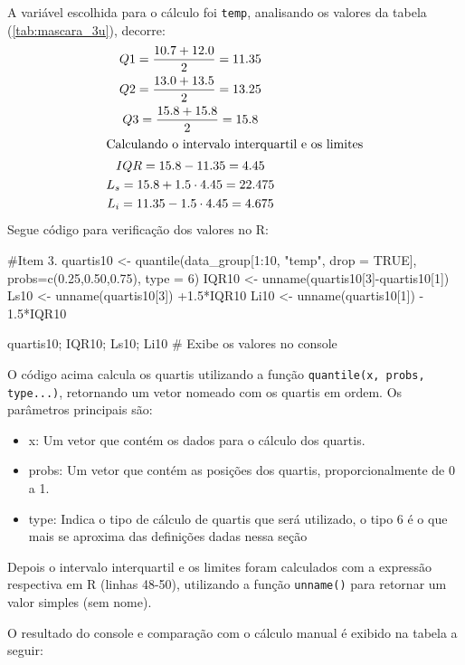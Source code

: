\documentclass[a4paper, 12pt, titlepage]{article}
\begin{document}
A variável escolhida para o cálculo foi \texttt{temp}, analisando os valores da tabela (\ref{tab:mascara_3u}), decorre:
\vspace*{-5mm}
\begin{gather*}
    Q1 = \frac{10.7+12.0}{2}= 11.35\\
    Q2 = \frac{13.0+13.5}{2}= 13.25 \\
    Q3 = \frac{15.8+15.8}{2}= 15.8 \\
    \intertext{Calculando o intervalo interquartil e os limites}
    IQR = 15.8 - 11.35= 4.45 \\
    L_s= 15.8 + 1.5 \cdot 4.45 = 22.475 \\
    L_i= 11.35-1.5 \cdot 4.45 = 4.675
\end{gather*}
\noindent Segue código para verificação dos valores no R:

\begin{rcode}[firstnumber=48, caption={Cálculo das 10 observações (2)},breaklines=true, breakatwhitespace=true]
    #Item 3.
    quartis10 <- quantile(data_group[1:10, "temp", drop = TRUE], probs=c(0.25,0.50,0.75), type = 6)
    IQR10 <- unname(quartis10[3]-quartis10[1])  
    Ls10 <- unname(quartis10[3]) +1.5*IQR10
    Li10 <- unname(quartis10[1]) - 1.5*IQR10

    quartis10; IQR10; Ls10; Li10 # Exibe os valores no console
\end{rcode}

O código acima calcula os quartis utilizando a função \texttt{quantile(x, probs, type...)}, retornando um vetor nomeado com os quartis em ordem. Os parâmetros principais são:
\begin{itemize}
    \item x: Um vetor que contém os dados para o cálculo dos quartis.
    \item probs: Um vetor que contém as posições dos quartis, proporcionalmente de 0 a 1.
    \item type: Indica o tipo de cálculo de quartis que será utilizado, o tipo 6 é o que mais se aproxima das definições dadas nessa seção 
\end{itemize}

Depois o intervalo interquartil e os limites foram calculados com a expressão respectiva em R (linhas 48-50), utilizando a função \texttt{unname()} para retornar um valor simples (sem nome).

\noindent O resultado do console e comparação com o cálculo manual é exibido na tabela a seguir:
\end{document}

